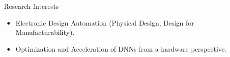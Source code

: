 
\begin{rSection}{Research Interests}
    
\begin{itemize}
    \item Electronic Design Automation (Physical Design, Design for Manufacturability).
    \item Optimization and Acceleration of DNNs from a hardware perspective.
\end{itemize}
\end{rSection}




